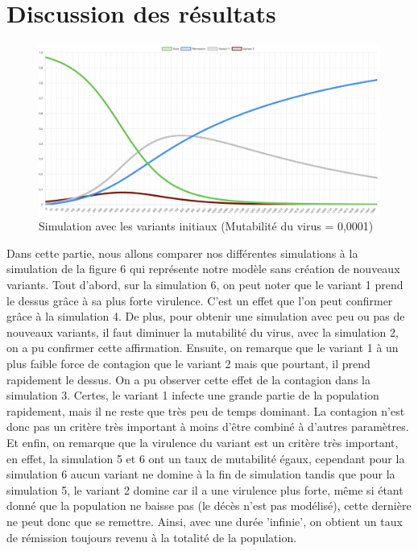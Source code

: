 \documentclass{article}
\begin{document}
\section{Discussion des résultats}

\begin{figure}[h]
    \includegraphics[width=\linewidth]{images/Simulation6.png}
    \caption{Simulation avec les variants initiaux (Mutabilité du virus = 0,0001)}
    \label{fig:simulation6}
\end{figure}

\noindent
Dans cette partie, nous allons comparer nos différentes simulations à la simulation de la figure 6 qui représente notre modèle sans création de nouveaux variants. Tout d'abord, sur la simulation 6, on peut noter que le variant 1 prend le dessus grâce à sa plus forte virulence. C'est un effet que l'on peut confirmer grâce à la simulation 4. De plus, pour obtenir une simulation avec peu ou pas de nouveaux variants, il faut diminuer la mutabilité du virus, avec la simulation 2, on a pu confirmer cette affirmation. Ensuite, on remarque que le variant 1 à un plus faible force de contagion que le variant 2 mais que pourtant, il prend rapidement le dessus. On a pu observer cette effet de la contagion dans la simulation 3. Certes, le variant 1 infecte une grande partie de la population rapidement, mais il ne reste que très peu de temps dominant. La contagion n'est donc pas un critère très important à moins d'être combiné à d'autres paramètres. Et enfin, on remarque que la virulence du variant est un critère très important, en effet, la simulation 5 et 6 ont un taux de mutabilité égaux, cependant pour la simulation 6 aucun variant ne domine à la fin de simulation tandis que pour la simulation 5, le variant 2 domine car il a une virulence plus forte, même si étant donné que la population ne baisse pas (le décès n'est pas modélisé), cette dernière ne peut donc que se remettre. Ainsi, avec une durée 'infinie', on obtient un taux de rémission toujours revenu à la totalité de la population. \\
\end{document}
